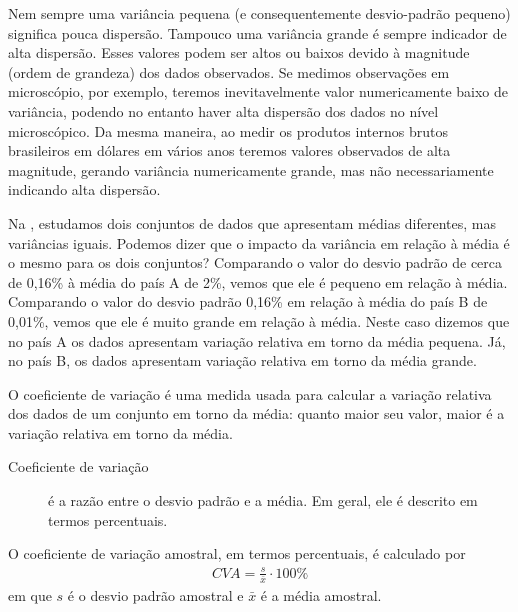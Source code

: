 
Nem sempre uma variância pequena (e consequentemente desvio-padrão pequeno) significa pouca dispersão. Tampouco uma variância grande é sempre indicador de alta dispersão. Esses valores podem ser altos ou baixos devido à magnitude (ordem de grandeza) dos dados observados. Se medimos observações em microscópio, por exemplo, teremos inevitavelmente valor numericamente baixo de variância, podendo no entanto haver alta dispersão dos dados no nível microscópico. Da mesma maneira, ao medir os produtos internos brutos brasileiros em dólares em vários anos teremos valores observados de alta magnitude, gerando variância numericamente grande, mas não necessariamente indicando alta dispersão.

Na , estudamos dois conjuntos de dados que apresentam médias diferentes, mas variâncias iguais. Podemos dizer que o impacto da variância em relação à média é o mesmo para os dois conjuntos? Comparando o valor do desvio padrão de cerca de 0,16\% à média do país A de 2\%, vemos que ele é pequeno em relação à média. Comparando o valor do desvio padrão 0,16\% em relação à média do país B de 0,01\%, vemos que ele é muito grande em relação à média. Neste caso dizemos que no país A os dados apresentam variação relativa em torno da média pequena. Já, no país B, os dados apresentam variação relativa em torno da média grande.

O coeficiente de variação é uma medida usada para calcular a variação relativa dos dados de um conjunto em torno da média: quanto maior seu valor, maior é a variação relativa em torno da média.
\begin{description}
\item[{Coeficiente de variação}] \leavevmode{}\label{\detokenize{PE104-4:term-coeficiente-de-variacao}}
é a razão entre o desvio padrão e a média. Em geral, ele é descrito em termos percentuais.

\end{description}

O coeficiente de variação amostral, em termos percentuais, é calculado  por
\begin{equation*}
\begin{split}CVA=\frac{s}{\bar{x}}\cdot 100 \%\end{split}
\end{equation*}
em que \(s\) é o desvio padrão amostral e \(\bar{x}\) é a média amostral.

